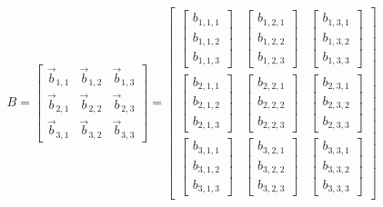 $$B = \begin{bmatrix}
\vec{b}_{1,1} & \vec{b}_{1,2} & \vec{b}_{1,3}\\
\vec{b}_{2,1} & \vec{b}_{2,2} & \vec{b}_{2,3}\\
\vec{b}_{3,1} & \vec{b}_{3,2} & \vec{b}_{3,3}
\end{bmatrix} 
= 
\begin{bmatrix}
\begin{bmatrix}b_{1,1,1} \\ b_{1,1,2} \\ b_{1,1,3} \end{bmatrix} & \begin{bmatrix}b_{1,2,1} \\ b_{1,2,2} \\ b_{1,2,3} \end{bmatrix} & \begin{bmatrix}b_{1,3,1} \\ b_{1,3,2} \\ b_{1,3,3}\end{bmatrix}\\
\begin{bmatrix}b_{2,1,1} \\ b_{2,1,2} \\ b_{2,1,3} \end{bmatrix} & \begin{bmatrix}b_{2,2,1} \\ b_{2,2,2} \\ b_{2,2,3} \end{bmatrix} & \begin{bmatrix}b_{2,3,1} \\ b_{2,3,2} \\ b_{2,3,3}\end{bmatrix}\\
\begin{bmatrix}b_{3,1,1} \\ b_{3,1,2} \\ b_{3,1,3} \end{bmatrix} & \begin{bmatrix}b_{3,2,1} \\ b_{3,2,2} \\ b_{3,2,3} \end{bmatrix} & \begin{bmatrix}b_{3,3,1} \\ b_{3,3,2} \\ b_{3,3,3}\end{bmatrix}
\end{bmatrix}$$

